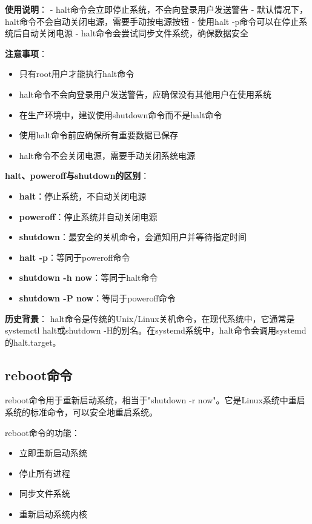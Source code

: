 \documentclass[12pt,UTF8]{ctexbook}
\begin{document}
\textbf{使用说明}：
- halt命令会立即停止系统，不会向登录用户发送警告
- 默认情况下，halt命令不会自动关闭电源，需要手动按电源按钮
- 使用halt -p命令可以在停止系统后自动关闭电源
- halt命令会尝试同步文件系统，确保数据安全

\textbf{注意事项}：
\begin{itemize}
    \item 只有root用户才能执行halt命令
    \item halt命令不会向登录用户发送警告，应确保没有其他用户在使用系统
    \item 在生产环境中，建议使用shutdown命令而不是halt命令
    \item 使用halt命令前应确保所有重要数据已保存
    \item halt命令不会关闭电源，需要手动关闭系统电源
\end{itemize}

\textbf{halt、poweroff与shutdown的区别}：
\begin{itemize}
    \item \textbf{halt}：停止系统，不自动关闭电源
    \item \textbf{poweroff}：停止系统并自动关闭电源
    \item \textbf{shutdown}：最安全的关机命令，会通知用户并等待指定时间
    \item \textbf{halt -p}：等同于poweroff命令
    \item \textbf{shutdown -h now}：等同于halt命令
    \item \textbf{shutdown -P now}：等同于poweroff命令
\end{itemize}

\textbf{历史背景}：
halt命令是传统的Unix/Linux关机命令，在现代系统中，它通常是systemctl halt或shutdown -H的别名。在systemd系统中，halt命令会调用systemd的halt.target。

\subsection{reboot命令}
reboot命令用于重新启动系统，相当于"shutdown -r now"。它是Linux系统中重启系统的标准命令，可以安全地重启系统。

reboot命令的功能：
\begin{itemize}
    \item 立即重新启动系统
    \item 停止所有进程
    \item 同步文件系统
    \item 重新启动系统内核
\end{itemize}
\end{document}
